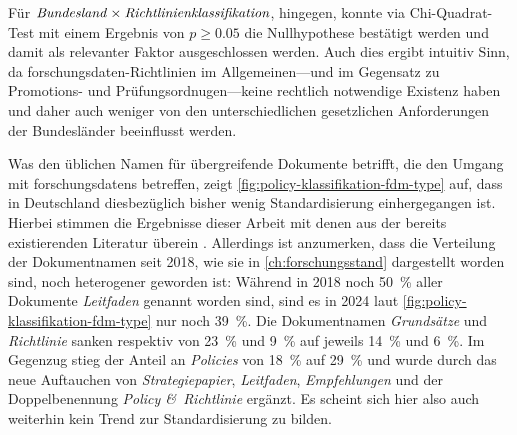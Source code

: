 Für $\text{\textit{Bundesland}}\times\text{\textit{Richtlinienklassifikation}}$, hingegen, konnte via Chi-Quadrat-Test mit einem Ergebnis von $p\geqslant\num{0,05}$ die Nullhypothese bestätigt werden und damit als relevanter Faktor ausgeschlossen werden.
Auch dies ergibt intuitiv Sinn, da \gls{forschungsdaten}-Richtlinien im Allgemeinen---und im Gegensatz zu Promotions- und Prüfungsordnugen---keine rechtlich notwendige Existenz haben und daher auch weniger von den unterschiedlichen gesetzlichen Anforderungen der Bundesländer beeinflusst werden.

Was den üblichen Namen für übergreifende Dokumente betrifft, die den Umgang mit \glspl{forschungsdaten} betreffen, zeigt \cref{fig:policy-klassifikation-fdm-type} auf, dass in Deutschland diesbezüglich bisher wenig Standardisierung einhergegangen ist.
Hierbei stimmen die Ergebnisse dieser Arbeit mit denen aus der bereits existierenden Literatur überein \autocite{Hiemenz2018-fdm-title,Hiemenz2018-fdm-report}.
Allerdings ist anzumerken, dass die Verteilung der Dokumentnamen seit 2018, wie sie in \cref{ch:forschungsstand} dargestellt worden sind, noch heterogener geworden ist:
Während in 2018 noch \SI{50}{\percent} aller Dokumente \textit{Leitfaden} genannt worden sind, sind es in 2024 laut \cref{fig:policy-klassifikation-fdm-type} nur noch \SI{39}{\percent}.
Die Dokumentnamen \textit{Grundsätze} und \textit{Richtlinie} sanken respektiv von \SI{23}{\percent} und \SI{9}{\percent} auf jeweils \SI{14}{\percent} und \SI{6}{\percent}.
Im Gegenzug stieg der Anteil an \textit{Policies} von \SI{18}{\percent} auf \SI{29}{\percent} und wurde durch das neue Auftauchen von \textit{Strategiepapier}, \textit{Leitfaden}, \textit{Empfehlungen} und der Doppelbenennung \textit{Policy \&\ Richtlinie} ergänzt.
Es scheint sich hier also auch weiterhin kein Trend zur Standardisierung zu bilden.

